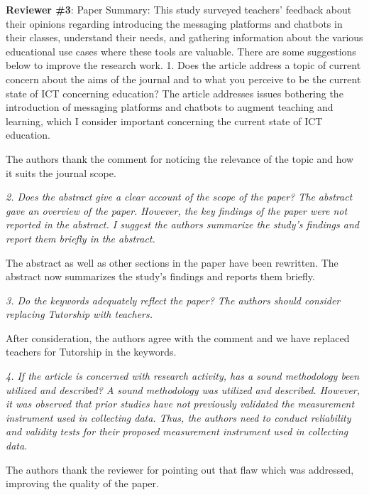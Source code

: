 \documentclass{letter}
\begin{document}

{\it

{\bf Reviewer \#3}: Paper Summary:
This study surveyed teachers' feedback about their opinions regarding introducing the messaging platforms and chatbots in their classes, understand their needs, and gathering information about the various educational use cases where these tools are valuable. There are some suggestions below to improve the research work.
1.      Does the article address a topic of current concern about the aims of the journal and to what you perceive to be the current state of ICT concerning education? The article addresses issues bothering the introduction of messaging platforms and chatbots to augment teaching and learning, which I consider important concerning the current state of ICT education.}


The authors thank the comment for noticing the relevance of the topic and how it suits the journal scope.

{\it 2.      Does the abstract give a clear account of the scope of the paper? The abstract gave an overview of the paper. However, the key findings of the paper were not reported in the abstract. I suggest the authors summarize the study's findings and report them briefly in the abstract.}


The abstract as well as other sections in the paper have been rewritten. The abstract now summarizes the study's findings and reports them briefly.


{\it 3.      Do the keywords adequately reflect the paper? The authors should consider replacing Tutorship with teachers.}

After consideration, the authors agree with the comment and we have replaced teachers for Tutorship in the keywords.


{\it 4.      If the article is concerned with research activity, has a sound methodology been utilized and described? A sound methodology was utilized and described. However, it was observed that prior studies have not previously validated the measurement instrument used in collecting data. Thus, the authors need to conduct reliability and validity tests for their proposed measurement instrument used in collecting data.}

The authors thank the reviewer for pointing out that flaw which was addressed, improving the quality of the paper.
\end{document}
